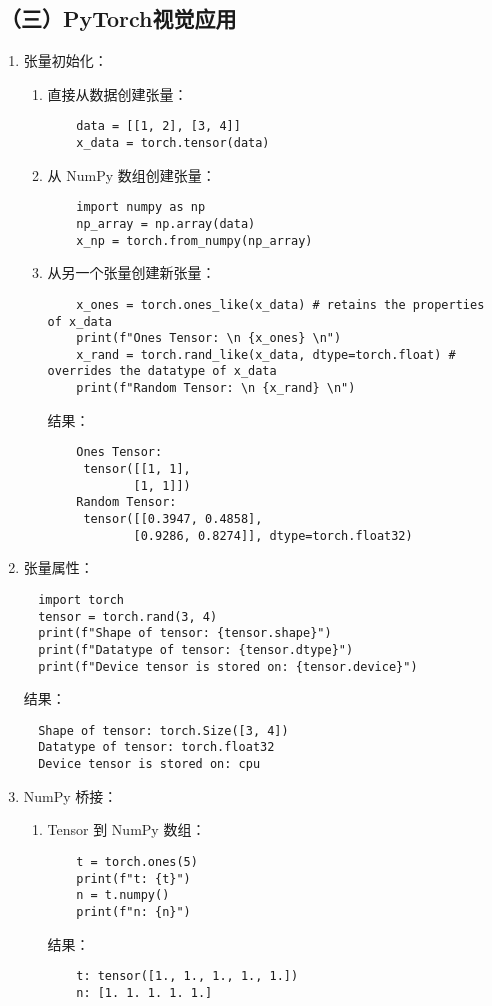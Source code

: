 \documentclass[UTF8]{ctexart}
\begin{document}
\subsection*{（三）PyTorch视觉应用}
\begin{enumerate}
  \item 张量初始化：
  \begin{enumerate}
    \item 直接从数据创建张量：
    \begin{verbatim}
    data = [[1, 2], [3, 4]]
    x_data = torch.tensor(data)
    \end{verbatim}
    
    \item 从 NumPy 数组创建张量：
    \begin{verbatim}
    import numpy as np
    np_array = np.array(data)
    x_np = torch.from_numpy(np_array)
    \end{verbatim}
    
    \item 从另一个张量创建新张量：
    \begin{verbatim}
    x_ones = torch.ones_like(x_data) # retains the properties of x_data
    print(f"Ones Tensor: \n {x_ones} \n")
    x_rand = torch.rand_like(x_data, dtype=torch.float) # overrides the datatype of x_data
    print(f"Random Tensor: \n {x_rand} \n")
    \end{verbatim}
    结果：
    \begin{verbatim}
    Ones Tensor:
     tensor([[1, 1],
            [1, 1]])
    Random Tensor:
     tensor([[0.3947, 0.4858],
            [0.9286, 0.8274]], dtype=torch.float32)
    \end{verbatim}
  \end{enumerate}
  
  \item 张量属性：
  \begin{verbatim}
  import torch
  tensor = torch.rand(3, 4)
  print(f"Shape of tensor: {tensor.shape}")
  print(f"Datatype of tensor: {tensor.dtype}")
  print(f"Device tensor is stored on: {tensor.device}")
  \end{verbatim}
  结果：
  \begin{verbatim}
  Shape of tensor: torch.Size([3, 4])
  Datatype of tensor: torch.float32
  Device tensor is stored on: cpu
  \end{verbatim}
  
  \item NumPy 桥接：
  \begin{enumerate}
    \item Tensor 到 NumPy 数组：
    \begin{verbatim}
    t = torch.ones(5)
    print(f"t: {t}")
    n = t.numpy()
    print(f"n: {n}")
    \end{verbatim}
    结果：
    \begin{verbatim}
    t: tensor([1., 1., 1., 1., 1.])
    n: [1. 1. 1. 1. 1.]
    \end{verbatim}
    

\end{enumerate}
\end{enumerate}
\end{document}
